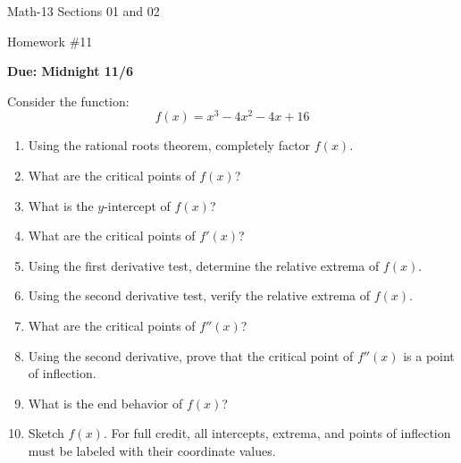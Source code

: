 \documentclass[letterpaper,12pt,fleqn]{article}
\begin{document}
\begin{center}
  \large
  Math-13 Sections 01 and 02

  \Large
  Homework \#11

  \large
  \textbf{Due: Midnight 11/6}
\end{center}

\vspace{0.5in}

Consider the function:
\[f(x)=x^3-4x^2-4x+16\]
\begin{enumerate}
\item Using the rational roots theorem, completely factor \(f(x)\).
\item What are the critical points of \(f(x)\)?
\item What is the \(y\)-intercept of \(f(x)\)?
\item What are the critical points of \(f'(x)\)?
\item Using the first derivative test, determine the relative extrema of \(f(x)\).
\item Using the second derivative test, verify the relative extrema of \(f(x)\).
\item What are the critical points of \(f''(x)\)?
\item Using the second derivative, prove that the critical point of \(f''(x)\) is a point of inflection.
\item What is the end behavior of \(f(x)\)?
\item Sketch \(f(x)\).  For full credit, all intercepts, extrema, and points of inflection must be labeled with
  their coordinate values.
\end{enumerate}
\end{document}
